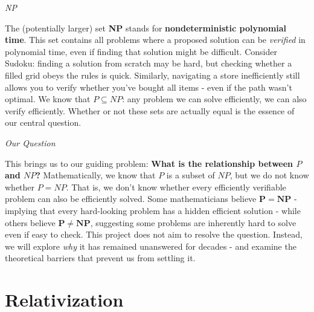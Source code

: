 \documentclass[12pt]{report}
\begin{document}
\begin{center}
    \vspace{0cm}
    {\Large\itshape NP\par}
\end{center}
The (potentially larger) set \textbf{NP} stands for \textbf{nondeterministic polynomial time}. This set contains all problems where a proposed solution can be \textit{verified} in polynomial time, even if finding that solution might be difficult.
Consider Sudoku: finding a solution from scratch may be hard, but checking whether a filled grid obeys the rules is quick. Similarly, navigating a store inefficiently still allows you to verify whether you've bought all items - even if the path wasn't optimal.
We know that $P \subseteq NP$: any problem we can solve efficiently, we can also verify efficiently. Whether or not these sets are actually equal is the essence of our central question.

\begin{center}
    \vspace{0cm}
    {\Large\itshape Our Question\par}
\end{center}
This brings us to our guiding problem: \textbf{What is the relationship between $P$ and $NP$?}
Mathematically, we know that $P$ is a subset of $NP$, but we do not know whether $P = NP$. That is, we don't know whether every efficiently verifiable problem can also be efficiently solved.
Some mathematicians believe $\mathbf{P = NP}$ - implying that every hard-looking problem has a hidden efficient solution - while others believe $\mathbf{P \neq NP}$, suggesting some problems are inherently hard to solve even if easy to check.
This project does not aim to resolve the question. Instead, we will explore \textit{why} it has remained unanswered for decades - and examine the theoretical barriers that prevent us from settling it.

\section*{Relativization}




\end{document}
